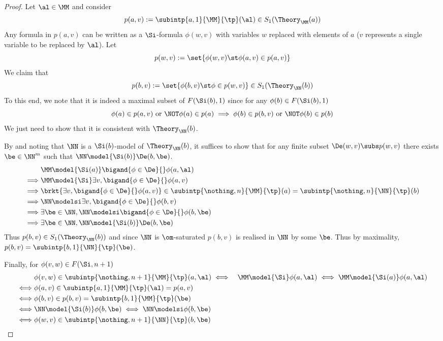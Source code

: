 \begin{proof}
    Let $\al \in \MM$ and consider 
    \[p(a,v) := \subintp{a,1}{\MM}{\tp}(\al) \in S_1(\Theory_\MM(a))\]
    Any formula in $p(a,v)$ can be written as a 
    $\Si$-formula $\phi(w,v)$ with variables $w$
    replaced with elements of $a$ 
    ($v$ represents a single variable to be replaced by $\al$). 
    Let 
    \[p(w,v) := \set{\phi(w,v) \st \phi(a,v) \in p(a,v)}\]
    We claim that 
    \[p(b,v) := \set{\phi(b,v) \st \phi \in p(w,v)} \in S_1(\Theory_\NN(b))\]
    To this end, we note that it is indeed 
    a maximal subset of $F(\Si(b),1)$ since for any $\phi(b) \in F(\Si(b),1)$
    \[\phi(a) \in p(a,v) \text{ or } \NOT \phi(a) \in p(a) \implies 
    \phi(b) \in p(b,v) \text{ or } \NOT \phi(b) \in p(b)\]
    We just need to show that it is consistent with $\Theory_\NN(b)$.

    By  
    and noting that $\NN$ is a $\Si(b)$-model of $\Theory_\NN(b)$,
    it suffices to show
    that for any finite subset $\De(w,v) \subs p(w,v)$ 
    there exists $\be \in \NN^m$ such that 
    $\NN \model{\Si(b)} \De(b,\be)$.
    \begin{align*}
        &\MM \model{\Si(a)} \bigand{\phi \in \De}{} \phi(a,\al)\\
        \implies &\MM \model{\Si} \exists v, \bigand{\phi \in \De}{} \phi(a,v)\\
        \implies &\brkt{\exists v, \bigand{\phi \in \De}{} \phi(a,v)} \in 
        \subintp{\nothing,n}{\MM}{\tp}(a) = 
        \subintp{\nothing,n}{\NN}{\tp}(b)\\
        \implies &\NN \modelsi \exists v, \bigand{\phi \in \De}{} \phi(b,v)\\
        \implies &\exists \be \in \NN, 
        \NN \modelsi \bigand{\phi \in \De}{} \phi(b,\be)\\
        \implies &\exists \be \in \NN, \NN \model{\Si(b)} \De(b,\be)
    \end{align*}
    Thus $p(b,v)\in S_1(\Theory_\NN(b))$ and since $\NN$ is $\om$-saturated
    $p(b,v)$ is realised in $\NN$ by some $\be$.
    Thus by maximality, $p(b,v) = \subintp{b,1}{\NN}{\tp}(\be)$.

    Finally, for $\phi(v,w) \in F(\Si,n+1)$
    \begin{align*}
        &\phi(v,w) \in \subintp{\nothing,n+1}{\MM}{\tp}(a,\al)
        \iff &\MM \model{\Si} \phi(a,\al) \iff \MM \model{\Si(a)} \phi(a,\al)\\
        \iff &\phi(a,v) \in \subintp{a,1}{\MM}{\tp}(\al) = p(a,v)\\
        \iff &\phi(b,v) \in p(b,v) = \subintp{b,1}{\MM}{\tp}(\be)\\
        \iff &\NN \model{\Si(b)} \phi(b,\be) \iff \NN \modelsi \phi(b,\be)\\
        \iff &\phi(w,v) \in \subintp{\nothing,n+1}{\NN}{\tp}(b,\be)
    \end{align*}
\end{proof}

